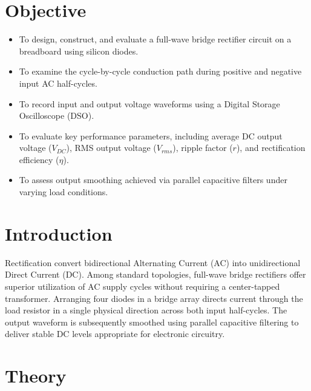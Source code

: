 \section{Objective}
\begin{itemize}
	\item To design, construct, and evaluate a full-wave bridge rectifier circuit on a breadboard using silicon diodes.
	\item To examine the cycle-by-cycle conduction path during positive and negative input AC half-cycles.
	\item To record input and output voltage waveforms using a Digital Storage Oscilloscope (DSO).
	\item To evaluate key performance parameters, including average DC output voltage ($V_{DC}$), RMS output voltage ($V_{rms}$), ripple factor ($r$), and rectification efficiency ($\eta$).
	\item To assess output smoothing achieved via parallel capacitive filters under varying load conditions.
\end{itemize}

\section{Introduction}
Rectification convert bidirectional Alternating Current (AC) into unidirectional Direct Current (DC). Among standard topologies, full-wave bridge rectifiers offer superior utilization of AC supply cycles without requiring a center-tapped transformer. Arranging four diodes in a bridge array directs current through the load resistor in a single physical direction across both input half-cycles. The output waveform is subsequently smoothed using parallel capacitive filtering to deliver stable DC levels appropriate for electronic circuitry.

\section{Theory}

